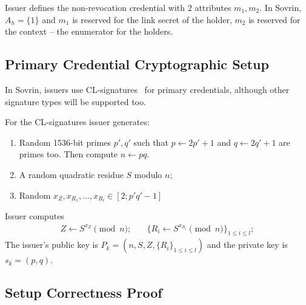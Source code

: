 Issuer defines the non-revocation credential  with $2$ attributes $m_1,m_2$. In Sovrin, $A_h = \{1\}$ and $m_1$ is reserved for the link secret of the holder, $m_2$ is reserved for the context -- the enumerator for the holders.


\subsection{Primary Credential Cryptographic Setup}\label{sec:setup-key1}
In Sovrin, issuers use CL-signatures~\cite{ACCUMULATORS} for primary credentials, although other signature types will be supported too.

For the CL-signatures issuer generates:
\begin{enumerate}
    \item Random 1536-bit primes $p',q'$ such that  $p \leftarrow 2p'+1$ and $q \leftarrow 2q'+1$ are primes too. Then compute $n \leftarrow pq$.
    \item A random quadratic residue  $S$ modulo $n$;
    \item Random $x_Z, x_{R_1},\ldots , x_{R_l}\in [2; p'q'-1]$
\end{enumerate}
Issuer computes
\begin{align}
    Z \leftarrow S^{x_Z}\pmod{n};&\quad \{R_i \leftarrow S^{x_{R_i}}\pmod{n}\}_{1\leq i \leq l};
\end{align}
The issuer's public key is $P_k = (n, S,Z,\{R_i\}_{1 \leq i\leq l})$ and the private key is $s_k = (p, q)$.\\
\subsection{Setup Correctness Proof}\label{sec:setup-proof}
